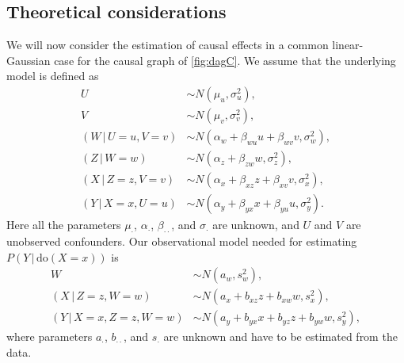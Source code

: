 \documentclass{statsoc}
\newcommand{\+}[1]{\ensuremath{\mathbf{#1}}}
\newcommand{\doo}{\textrm{do}}
\newcommand{\given}{{ \, | \, }}
\begin{document}
\subsection{Theoretical considerations}
We will now consider the estimation of causal effects in a common linear-Gaussian case for the causal graph of \autoref{fig:dagC}. We assume that the underlying model is defined as
\begin{equation} 
\label{eq:dgm}
\begin{aligned}
U &\sim N(\mu_{u}, \sigma_{u}^2),\\
V &\sim N(\mu_{v}, \sigma_{v}^2),\\
(W \given U = u, V = v) &\sim N(\alpha_{w} + \beta_{wu}u + \beta_{wv}v, \sigma_w^2),\\
(Z \given W = w) &\sim N(\alpha_z + \beta_{zw} w, \sigma_z^2),\\
(X \given Z = z, V = v) &\sim N(\alpha_x + \beta_{xz} z + \beta_{xv} v, \sigma_x^2),\\
(Y \given X = x, U = u) &\sim N(\alpha_y + \beta_{yx} x + \beta_{yu} u, \sigma_y^2).
\end{aligned}
\end{equation}
Here all the parameters $\mu_{\cdot}$, $\alpha_{\cdot}$, $\beta_{\cdot\cdot}$, and $\sigma_{\cdot}$ are unknown, and $U$ and $V$ are unobserved confounders. Our observational model needed for estimating $P(Y \given \doo(X = x))$ is
\begin{equation} 
\label{eq:cm}
\begin{aligned}
W &\sim N(a_{w}, s_w^2),\\
(X \given Z = z, W = w)&\sim N(a_x + b_{xz} z + b_{xw} w, s_x^2),\\
(Y \given X = x, Z = z, W = w) &\sim N(a_y + b_{yx} x + b_{yz} z + b_{yw} w, s_y^2),
\end{aligned}
\end{equation}
where parameters $a_{\cdot}$, $b_{\cdot\cdot}$, and $s_{\cdot}$ are unknown and have to be estimated from the data.
\end{document}
